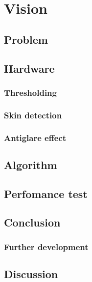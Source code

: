 \chapter{Vision}
\section{Problem}
\section{Hardware}
\subsection{Thresholding}
\subsection{Skin detection}
\subsection{Antiglare effect}
\section{Algorithm}
\section{Perfomance test}
\section{Conclusion}
\subsection{Further development}
\section{Discussion}
\newpage